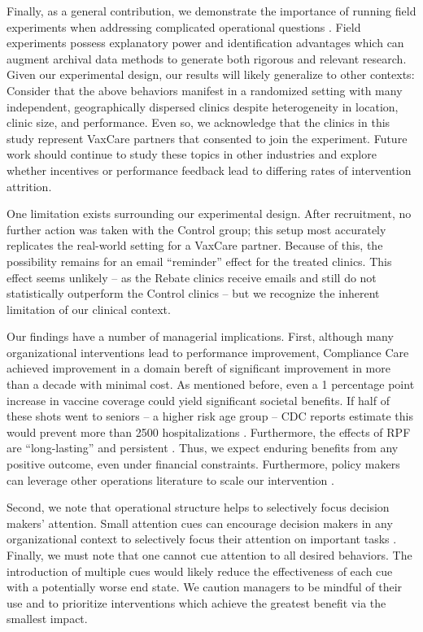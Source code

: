  Finally, as a general contribution, we demonstrate the importance of running field experiments when addressing complicated operational questions \citep{Ibanez2019a}. Field experiments possess explanatory power and identification advantages which can augment archival data methods to generate both rigorous and relevant research. Given our experimental design, our results will likely generalize to other contexts: Consider that the above behaviors manifest in a randomized setting with many independent, geographically dispersed clinics despite heterogeneity in location, clinic size, and performance. Even so, we acknowledge that the clinics in this study represent VaxCare partners that consented to join the experiment. Future work should continue to study these topics in other industries and explore whether incentives or performance feedback lead to differing rates of intervention attrition.
 
 One limitation exists surrounding our experimental design. After recruitment, no further action was taken with the Control group; this setup most accurately replicates the real-world setting for a VaxCare partner. Because of this, the possibility remains for an email “reminder” effect for the treated clinics. This effect seems unlikely – as the Rebate clinics receive emails and still do not statistically outperform the Control clinics – but we recognize the inherent limitation of our clinical context. 
 
 Our findings have a number of managerial implications. First, although many organizational interventions lead to performance improvement, Compliance Care achieved improvement in a domain bereft of significant improvement in more than a decade with minimal cost. As mentioned before, even a 1 percentage point increase in vaccine coverage could yield significant societal benefits. If half of these shots went to seniors – a higher risk age group – CDC reports estimate this would prevent more than 2500 hospitalizations \citep{Rolfes2019}. Furthermore, the effects of RPF are “long-lasting” \citep{Blanes-i-Vidal2011} and persistent \citep{Delfgaauw2013}. Thus, we expect enduring benefits from any positive outcome, even under financial constraints. Furthermore, policy makers can leverage other operations literature to scale our intervention \citep{Drakopoulos2017, Gupta2020}.
 
 Second, we note that operational structure helps to selectively focus decision makers’ attention. Small attention cues can encourage decision makers in any organizational context to selectively focus their attention on important tasks \citep[e.g.,][]{Song2018a,Kim2020}. Finally, we must note that one cannot cue attention to all desired behaviors. The introduction of multiple cues would likely reduce the effectiveness of each cue with a potentially worse end state. We caution managers to be mindful of their use and to prioritize interventions which achieve the greatest benefit via the smallest impact.
 
